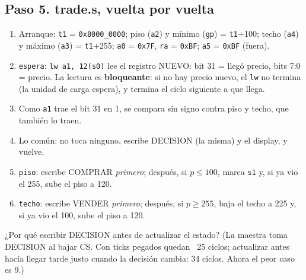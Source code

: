 \documentclass[11pt,letterpaper]{article}
\begin{document}
\subsection*{Paso 5. trade.s, vuelta por vuelta}
\begin{enumerate}
\item Arranque: \texttt{t1} = \texttt{0x8000\_0000}; piso (\texttt{a2}) y mínimo (\texttt{gp}) = \texttt{t1}+100;
  techo (\texttt{a4}) y máximo (\texttt{a3}) = \texttt{t1}+255; \texttt{a0} = \texttt{0x7F}, \texttt{ra} =
  \texttt{0xBF}; \texttt{a5} = \texttt{0xBF} (fuera).
\item \texttt{espera}: \texttt{lw a1, 12(s0)} lee el registro NUEVO: bit 31 = llegó precio, bits 7:0 = precio.
  La lectura es \textbf{bloqueante}: si no hay precio nuevo, el \texttt{lw} no termina (la unidad de carga
  espera), y termina el ciclo siguiente a que llega.
\item Como \texttt{a1} trae el bit 31 en 1, se compara sin signo contra piso y techo, que también lo traen.
\item Lo común: no toca ninguno, escribe DECISION (la misma) y el display, y vuelve.
\item \texttt{piso}: escribe COMPRAR \emph{primero}; después, si $p \le 100$, marca \texttt{s1} y, si ya vio el
  255, sube el piso a 120.
\item \texttt{techo}: escribe VENDER \emph{primero}; después, si $p \ge 255$, baja el techo a 225 y, si ya vio el
  100, sube el piso a 120.
\end{enumerate}
\begin{checkpoint}
¿Por qué escribir DECISION antes de actualizar el estado? (La maestra toma DECISION al bajar CS. Con ticks
pegados quedan ~25 ciclos; actualizar antes hacía llegar tarde justo cuando la decisión cambia: 34 ciclos.
Ahora el peor caso es 9.)
\end{checkpoint}
\end{document}
